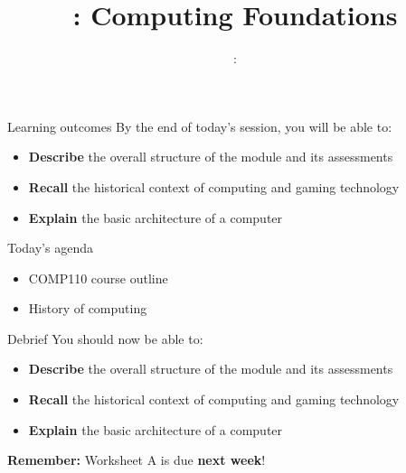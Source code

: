 \usepackage{../../beamerthemeFalmouthGamesAcademy}
\usepackage{multimedia}
\graphicspath{ {../../} }


\usepackage[normalem]{ulem}
\usepackage{wasysym}

\usepackage{pdfpages}

\usetikzlibrary{arrows,automata}




\title{\sessionnumber: Computing Foundations}
\subtitle{\modulecode: \moduletitle}

\frame{\titlepage} 

\begin{frame}{Learning outcomes}
	By the end of today's session, you will be able to:
	\begin{itemize}
		\item \textbf{Describe} the overall structure of the module and its assessments
		\item \textbf{Recall} the historical context of computing and gaming technology
		\item \textbf{Explain} the basic architecture of a computer
	\end{itemize}
\end{frame}

\begin{frame}{Today's agenda}
	\begin{itemize}
		\item COMP110 course outline
		\item History of computing
	\end{itemize}
\end{frame}





\begin{frame}{Debrief}
	\pause You should now be able to:
	\begin{itemize}
		\item \textbf{Describe} the overall structure of the module and its assessments
		\item \textbf{Recall} the historical context of computing and gaming technology
		\item \textbf{Explain} the basic architecture of a computer
	\end{itemize}
	\pause \textbf{Remember:} Worksheet A is due \textbf{next week}!
\end{frame}


